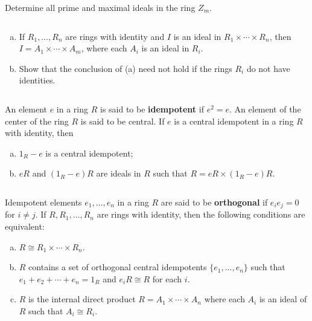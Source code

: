 $$ $$

\begin{ex}
    Determine all prime and maximal ideals in the ring $Z_{m}$.
\end{ex}

$$ $$

\begin{ex}
    \begin{enumerate}[(a)]
        \item If $R_{1},\dots, R_{n}$ are rings with identity and $I$ is an ideal in $R_{1}\times \cdots\times R_{n}$, then $I=A_{1}\times \cdots\times A_{m}$, where each $A_{i}$ is an ideal in $R_{i}$.
        \item Show that the conclusion of (a) need not hold if the rings $R_{i}$ do not have identities.
    \end{enumerate}
\end{ex}

$$ $$

\begin{ex}
    An element $e$ in a ring $R$ is said to be \textbf{idempotent} if $e^{2}=e$. An element  of the center of the ring $R$ is said to be central. If $e$ is a central idempotent in a ring $R$ with identity, then
    \begin{enumerate}[(a)]
        \item $1_{R}-e$ is a central idempotent;
        \item $eR$ and $(1_{R}-e)R$ are ideals in $R$ such that $R=eR\times (1_{R}-e)R$.
    \end{enumerate}
\end{ex}

$$ $$

\begin{ex}
    Idempotent elements $e_{1},\dots,e_{n}$ in a ring $R$ are said to be \textbf{orthogonal} if $e_{i}e_{j}=0$ for $i\neq j$. If $R,R_{1},\dots, R_{n}$ are rings with identity, then the following conditions are equivalent:
    \begin{enumerate}[(a)]
        \item $R\cong R_{1}\times \cdots\times R_{n}$.
        \item $R$ contains a set of orthogonal central idempotents $\{e_{1}, \dots, e_{n}\}$ such that $e_{1}+e_{2}+\cdots+e_{n}=1_{R}$ and $e_{i}R\cong R$ for each $i$.
        \item $R$ is the internal direct product $R=A_{1}\times \cdots\times A_{n}$ where each $A_{i}$ is an ideal of $R$ such that $A_{i}\cong R_{i}$.
    \end{enumerate}
\end{ex}


